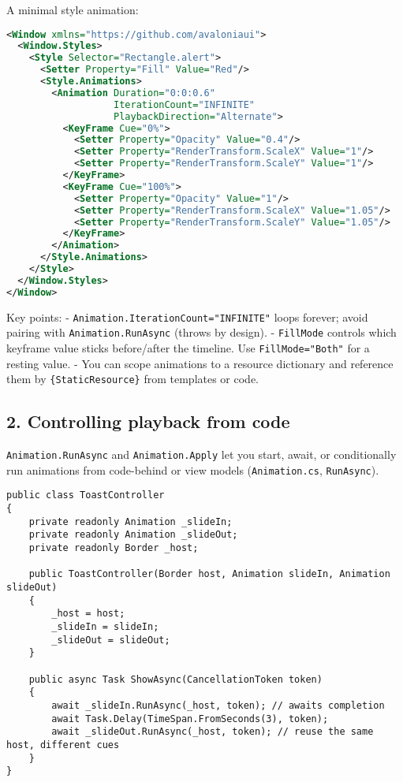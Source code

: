 A minimal style animation:

\begin{lstlisting}[language=XML]
<Window xmlns="https://github.com/avaloniaui">
  <Window.Styles>
    <Style Selector="Rectangle.alert">
      <Setter Property="Fill" Value="Red"/>
      <Style.Animations>
        <Animation Duration="0:0:0.6"
                   IterationCount="INFINITE"
                   PlaybackDirection="Alternate">
          <KeyFrame Cue="0%">
            <Setter Property="Opacity" Value="0.4"/>
            <Setter Property="RenderTransform.ScaleX" Value="1"/>
            <Setter Property="RenderTransform.ScaleY" Value="1"/>
          </KeyFrame>
          <KeyFrame Cue="100%">
            <Setter Property="Opacity" Value="1"/>
            <Setter Property="RenderTransform.ScaleX" Value="1.05"/>
            <Setter Property="RenderTransform.ScaleY" Value="1.05"/>
          </KeyFrame>
        </Animation>
      </Style.Animations>
    </Style>
  </Window.Styles>
</Window>
\end{lstlisting}

Key points: -
\passthrough{\lstinline!Animation.IterationCount="INFINITE"!} loops
forever; avoid pairing with \passthrough{\lstinline!Animation.RunAsync!}
(throws by design). - \passthrough{\lstinline!FillMode!} controls which
keyframe value sticks before/after the timeline. Use
\passthrough{\lstinline!FillMode="Both"!} for a resting value. - You can
scope animations to a resource dictionary and reference them by
\passthrough{\lstinline!\{StaticResource\}!} from templates or code.

\subsection{2. Controlling playback from
code}\label{controlling-playback-from-code}

\passthrough{\lstinline!Animation.RunAsync!} and
\passthrough{\lstinline!Animation.Apply!} let you start, await, or
conditionally run animations from code-behind or view models
(\passthrough{\lstinline!Animation.cs!},
\passthrough{\lstinline!RunAsync!}).

\begin{lstlisting}
public class ToastController
{
    private readonly Animation _slideIn;
    private readonly Animation _slideOut;
    private readonly Border _host;

    public ToastController(Border host, Animation slideIn, Animation slideOut)
    {
        _host = host;
        _slideIn = slideIn;
        _slideOut = slideOut;
    }

    public async Task ShowAsync(CancellationToken token)
    {
        await _slideIn.RunAsync(_host, token); // awaits completion
        await Task.Delay(TimeSpan.FromSeconds(3), token);
        await _slideOut.RunAsync(_host, token); // reuse the same host, different cues
    }
}
\end{lstlisting}

